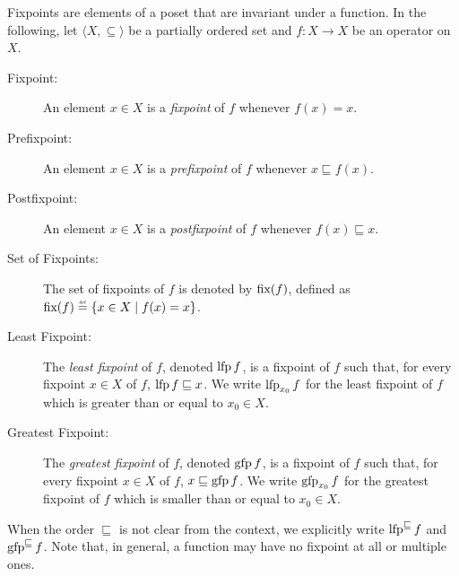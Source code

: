 Fixpoints are elements of a poset that are invariant under a function.
In the following, let $\langle X, \subseteq \rangle$ be a partially ordered set and $f : X \to X$ be an operator on $X$.

\begin{description}
  \item[Fixpoint:] An element $x \in X$ is a \emph{fixpoint} of $f$ whenever $f(x) = x$.
  \item[Prefixpoint:] An element $x \in X$ is a \emph{prefixpoint} of $f$ whenever $x \sqsubseteq f(x)$.
  \item[Postfixpoint:] An element $x \in X$ is a \emph{postfixpoint} of $f$ whenever $f(x) \sqsubseteq x$.
  \item[Set of Fixpoints:] The set of fixpoints of $f$ is denoted by $\textup{fix}(f)$, defined as $\fixpoints(f) \defeq \setdef{x \in X}{f(x) = x}$.
  \item[Least Fixpoint:] The \emph{least fixpoint} of $f$, denoted $\operatorname{lfp} f$, is a fixpoint of $f$ such that, for every fixpoint $x \in X$ of $f$, $\operatorname{lfp} f \sqsubseteq x$. We write $\operatorname{lfp}_{x_0} f$ for the least fixpoint of $f$ which is greater than or equal to $x_0 \in X$.
  \item[Greatest Fixpoint:] The \emph{greatest fixpoint} of $f$, denoted $\operatorname{gfp} f$, is a fixpoint of $f$ such that, for every fixpoint $x \in X$ of $f$, $x \sqsubseteq \operatorname{gfp} f$. We write $\operatorname{gfp}_{x_0} f$ for the greatest fixpoint of $f$ which is smaller than or equal to $x_0 \in X$.
\end{description}

When the order $\sqsubseteq$ is not clear from the context, we explicitly write $\operatorname{lfp}^{\sqsubseteq} f$ and $\operatorname{gfp}^{\sqsubseteq} f$. Note that, in general, a function may have no fixpoint at all or multiple ones.

